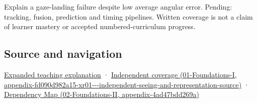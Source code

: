 Explain a gaze-landing failure despite low average angular error. Pending: tracking, fusion, prediction and timing pipelines. Written coverage is not a claim of learner mastery or accepted numbered-curriculum progress.

\subsection{Source and navigation}\label{appendix-a6f2c4fe1996-source-and-navigation}

\hyperref[04-visual-computing-ii-ch042-a-gaze-sample-needs-a-time-as-well-as-a-direction]{Expanded teaching explanation} · \href{../01-Foundations-I/main.pdf\#nameddest=appendix-fd090d982a15-xr01---independent-seeing-and-representation-source}{Independent coverage (01-Foundations-I, appendix-fd090d982a15-xr01-\/-\/-independent-seeing-and-representation-source)} · \href{../02-Foundations-II/main.pdf\#nameddest=appendix-4ad47bdd269a}{Dependency Map (02-Foundations-II, appendix-4ad47bdd269a)}
